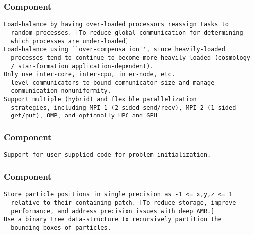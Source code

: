 \documentclass[14pt,letter]{article}
\begin{document}
\subsubsection{ Component}

\begin{verbatim}
Load-balance by having over-loaded processors reassign tasks to
  random processes. [To reduce global communication for determining
  which processes are under-loaded]
Load-balance using ``over-compensation'', since heavily-loaded
  processes tend to continue to become more heavily loaded (cosmology
  / star-formation application-dependent).
Only use inter-core, inter-cpu, inter-node, etc.
  level-communicators to bound communicator size and manage
  communication nonuniformity.
Support multiple (hybrid) and flexible parallelization
  strategies, including MPI-1 (2-sided send/recv), MPI-2 (1-sided
  get/put), OMP, and optionally UPC and GPU.
\end{verbatim}

\subsubsection{ Component}

\begin{verbatim}
Support for user-supplied code for problem initialization.
\end{verbatim}

\subsubsection{ Component}

\begin{verbatim}
Store particle positions in single precision as -1 <= x,y,z <= 1
  relative to their containing patch. [To reduce storage, improve
  performance, and address precision issues with deep AMR.]
Use a binary tree data-structure to recursively partition the
  bounding boxes of particles.
\end{verbatim}
\end{document}
